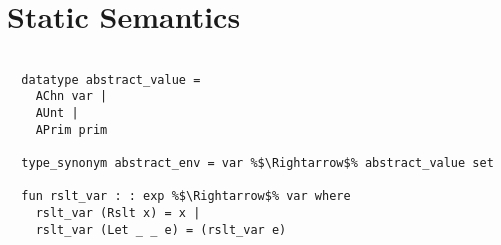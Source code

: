 \documentclass{article}
\begin{document}
\section{Static Semantics}
\begin{lstlisting}[style=codestyle1, escapechar=\%]

  datatype abstract_value =
    AChn var |
    AUnt |
    APrim prim

  type_synonym abstract_env = var %$\Rightarrow$% abstract_value set

  fun rslt_var : : exp %$\Rightarrow$% var where
    rslt_var (Rslt x) = x |
    rslt_var (Let _ _ e) = (rslt_var e)

  \end{lstlisting}
\begin{lstlisting}[style=codestyle1, escapechar=\%]



\end{lstlisting}
\end{document}

